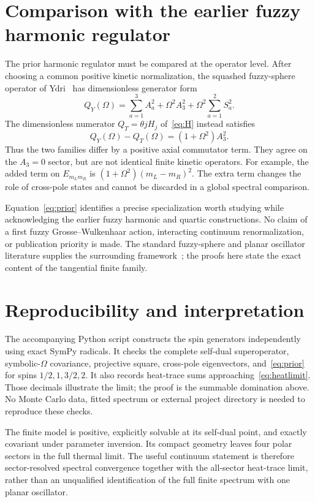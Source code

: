 \documentclass[11pt,a4paper]{article}
\theoremstyle{remark}\newtheorem{remark}[theorem]{Remark}
\begin{document}
\section{Comparison with the earlier fuzzy harmonic regulator}
The prior harmonic regulator must be compared at the operator level.
After choosing a common positive kinetic normalization, the squashed fuzzy-sphere operator of Ydri~\citep[Sec.~4.2]{Ydri2014} has dimensionless generator form
\begin{equation}
 Q_Y(\Omega)=\sum_{a=1}^3A_a^2+\Omega^2A_3^2
 +\Omega^2\sum_{a=1}^2S_a^2.
\end{equation}
The dimensionless numerator $Q_T=\theta jH_j$ of~\eqref{eq:H} instead satisfies
\begin{equation}\label{eq:prior}
 Q_Y(\Omega)-Q_T(\Omega)=(1+\Omega^2)A_3^2.
\end{equation}
Thus the two families differ by a positive axial commutator term.
They agree on the $A_3=0$ sector, but are not identical finite kinetic operators.
For example, the added term on $E_{m_Lm_R}$ is $(1+\Omega^2)(m_L-m_R)^2$.
The extra term changes the role of cross-pole states and cannot be discarded in a global spectral comparison.

Equation~\eqref{eq:prior} identifies a precise specialization worth studying while acknowledging the earlier fuzzy harmonic and quartic constructions.
No claim of a first fuzzy Grosse--Wulkenhaar action, interacting continuum renormalization, or publication priority is made.
The standard fuzzy-sphere and planar oscillator literature supplies the surrounding framework~\citep{ChuMadoreSteinacker2001,GrosseWulkenhaar2005}; the proofs here state the exact content of the tangential finite family.

\section{Reproducibility and interpretation}
The accompanying Python script constructs the spin generators independently using exact SymPy radicals.
It checks the complete self-dual superoperator, symbolic-$\Omega$ covariance, projective square, cross-pole eigenvectors, and~\eqref{eq:prior} for spins $1/2,1,3/2,2$.
It also records heat-trace sums approaching~\eqref{eq:heatlimit}.
Those decimals illustrate the limit; the proof is the summable domination above.
No Monte Carlo data, fitted spectrum or external project directory is needed to reproduce these checks.

The finite model is positive, explicitly solvable at its self-dual point, and exactly covariant under parameter inversion.
Its compact geometry leaves four polar sectors in the full thermal limit.
The useful continuum statement is therefore sector-resolved spectral convergence together with the all-sector heat-trace limit, rather than an unqualified identification of the full finite spectrum with one planar oscillator.
\end{document}

